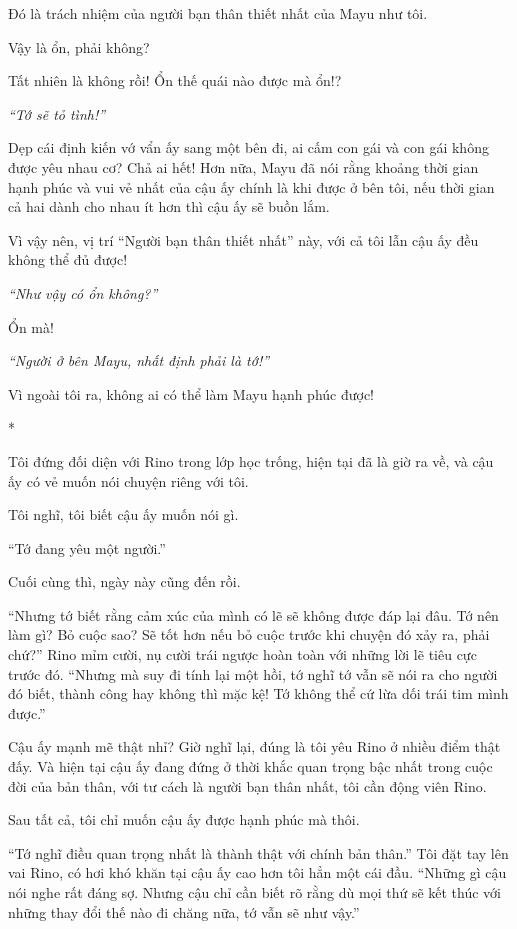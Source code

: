 {    Đó là trách nhiệm của người bạn thân thiết nhất của Mayu như tôi.

    Vậy là ổn, phải không?

    Tất nhiên là không rồi! Ổn thế quái nào được mà ổn!?

    \emph{``Tớ sẽ tỏ tình!''}

    Dẹp cái định kiến vớ vẩn ấy sang một bên đi, ai cấm con gái và con gái
    không được yêu nhau cơ? Chả ai hết! Hơn nữa, Mayu đã nói rằng khoảng
    thời gian hạnh phúc và vui vẻ nhất của cậu ấy chính là khi được ở bên
    tôi, nếu thời gian cả hai dành cho nhau ít hơn thì cậu ấy sẽ buồn lắm.

    Vì vậy nên, vị trí ``Người bạn thân thiết nhất'' này, với cả tôi lẫn cậu
    ấy đều không thể đủ được!

    \emph{``Như vậy có ổn không?''}

    Ổn mà!

    \emph{``Người ở bên Mayu, nhất định phải là tớ!''}

    Vì ngoài tôi ra, không ai có thể làm Mayu hạnh phúc được!

    *

    Tôi đứng đối diện với Rino trong lớp học trống, hiện tại đã là giờ ra
    về, và cậu ấy có vẻ muốn nói chuyện riêng với tôi.

    Tôi nghĩ, tôi biết cậu ấy muốn nói gì.

    ``Tớ đang yêu một người.''

    Cuối cùng thì, ngày này cũng đến rồi.

    ``Nhưng tớ biết rằng cảm xúc của mình có lẽ sẽ không được đáp lại đâu.
    Tớ nên làm gì? Bỏ cuộc sao? Sẽ tốt hơn nếu bỏ cuộc trước khi chuyện đó
    xảy ra, phải chứ?'' Rino mỉm cười, nụ cười trái ngược hoàn toàn với
    những lời lẽ tiêu cực trước đó. ``Nhưng mà suy đi tính lại một hồi, tớ
    nghĩ tớ vẫn sẽ nói ra cho người đó biết, thành công hay không thì mặc
    kệ! Tớ không thể cứ lừa dối trái tim mình được.''

    Cậu ấy mạnh mẽ thật nhỉ? Giờ nghĩ lại, đúng là tôi yêu Rino ở nhiều điểm
    thật đấy. Và hiện tại cậu ấy đang đứng ở thời khắc quan trọng bậc nhất
    trong cuộc đời của bản thân, với tư cách là người bạn thân nhất, tôi cần
    động viên Rino.

    Sau tất cả, tôi chỉ muốn cậu ấy được hạnh phúc mà thôi.

    ``Tớ nghĩ điều quan trọng nhất là thành thật với chính bản thân.'' Tôi
    đặt tay lên vai Rino, có hơi khó khăn tại cậu ấy cao hơn tôi hẳn một cái
    đầu. ``Những gì cậu nói nghe rất đáng sợ. Nhưng cậu chỉ cần biết rõ rằng
    dù mọi thứ sẽ kết thúc với những thay đổi thế nào đi chăng nữa, tớ vẫn
    sẽ như vậy.''

}
